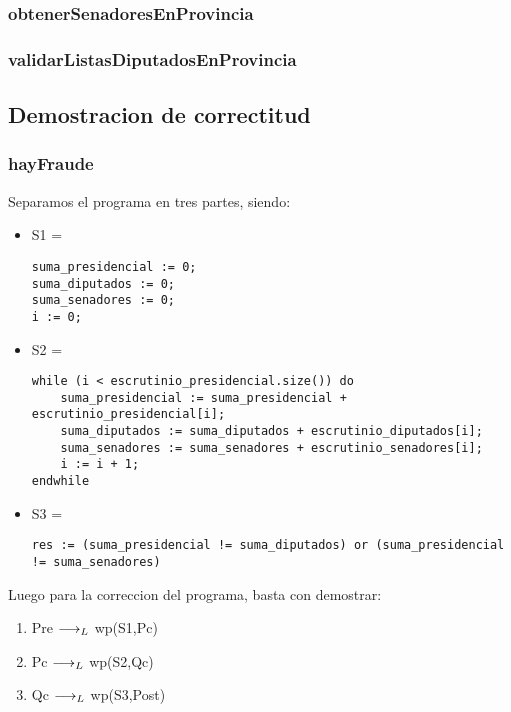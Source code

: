 \documentclass[10pt,a4paper]{article}
\begin{document}
\subsubsection{obtenerSenadoresEnProvincia}

\subsubsection{validarListasDiputadosEnProvincia}

\subsection{Demostracion de correctitud}

\subsubsection{hayFraude}

Separamos el programa en tres partes, siendo:

\vspace{5mm}
\begin{itemize}
    \item S1 = 
\begin{lstlisting}[caption={},label=code:for]
suma_presidencial := 0;
suma_diputados := 0;
suma_senadores := 0;
i := 0;
    \end{lstlisting}
\vspace{5mm}
\item S2 = 
\begin{lstlisting}[caption={},label=code:for]
while (i < escrutinio_presidencial.size()) do
    suma_presidencial := suma_presidencial + escrutinio_presidencial[i];
    suma_diputados := suma_diputados + escrutinio_diputados[i];
    suma_senadores := suma_senadores + escrutinio_senadores[i];
    i := i + 1;
endwhile
    \end{lstlisting}
\vspace{5mm}
\item S3 = 
\begin{lstlisting}[caption={},label=code:for]
res := (suma_presidencial != suma_diputados) or (suma_presidencial != suma_senadores)
    \end{lstlisting}
\vspace{5mm}
\end{itemize}


Luego para la correccion del programa, basta con demostrar:

\begin{enumerate}
\item Pre $\longrightarrow _L$ wp(S1,Pc)
\item Pc $\longrightarrow _L$ wp(S2,Qc)
\item Qc $\longrightarrow _L$ wp(S3,Post)
\end{enumerate}
\end{document}
